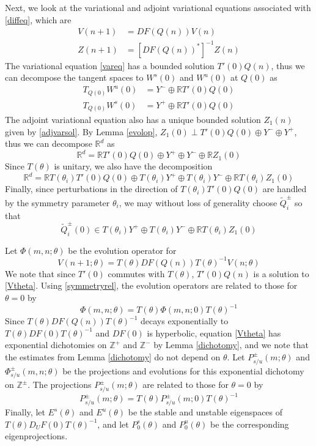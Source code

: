 \documentclass[12pt]{article}
\def\R{{\mathbb R}}
\def\Z{{\mathbb Z}}
\begin{document}
Next, we look at the variational and adjoint variational equations associated with \eqref{diffeq}, which are
\begin{align}
V(n+1) &= D F(Q(n)) V(n) \label{vareq} \\
Z(n+1) &= [D F(Q(n))^*]^{-1} Z(n) \label{adjvareq} 
\end{align}
The variational equation \eqref{vareq} has a bounded solution $T'(0) Q(n)$, thus we can decompose the tangent spaces to $W^s(0)$ and $W^u(0)$ at $Q(0)$ as
\begin{align*}
T_{Q(0)} W^u(0) &= Y^- \oplus \R T'(0) Q(0) \\
T_{Q(0)} W^s(0) &= Y^+ \oplus \R T'(0) Q(0)
\end{align*}
The adjoint variational equation also has a unique bounded solution $Z_1(n)$ given by \eqref{adjvarsol}. By Lemma \ref{evolop}, $Z_1(0) \perp T'(0) Q(0) \oplus Y^- \oplus Y^+$, thus we can decompose $\R^d$ as
\begin{equation}\label{nontdecomp}
\R^d = \R T'(0) Q(0) \oplus Y^+ \oplus Y^- \oplus \R Z_1(0)
\end{equation}
Since $T(\theta)$ is unitary, we also have the decomposition
\begin{equation}\label{nontdecompT}
\R^d = \R T(\theta_i) T'(0) Q(0) \oplus T(\theta_i) Y^+ \oplus T(\theta_i) Y^- \oplus \R T(\theta_i) Z_1(0)
\end{equation}
Finally, since perturbations in the direction of $T(\theta_i) T'(0) Q(0)$ are handled by the symmetry parameter $\theta_i$, we may without loss of generality choose $\tilde{Q}_i^\pm$ so that 
\begin{equation}\label{W0loc}
\tilde{Q}_i^\pm(0) \in T(\theta_i) Y^+ \oplus T(\theta_i) Y^- \oplus \R T(\theta_i) Z_1(0)
\end{equation}

Let $\Phi(m, n; \theta)$ be the evolution operator for
\begin{equation}\label{Vtheta}
V(n+1; \theta) = T(\theta) D F(Q(n)) T(\theta)^{-1} V(n; \theta) 
\end{equation}
We note that since $T'(0)$ commutes with $T(\theta)$, $T'(0)Q(n)$ is a solution to \eqref{Vtheta}. Using \eqref{symmetryrel}, the evolution operators are related to those for $\theta = 0$ by
\begin{equation}\label{evoloptheta}
\Phi(m, n; \theta) = T(\theta)\Phi(m, n; 0)T(\theta)^{-1}
\end{equation}
Since $T(\theta) D F(Q(n)) T(\theta)^{-1}$ decays exponentially to $T(\theta) D F(0) T(\theta)^{-1}$ and $D F(0)$ is hyperbolic, equation \eqref{Vtheta} has exponential dichotomies on $\Z^+$ and $\Z^-$ by Lemma \ref{dichotomy}, and we note that the estimates from Lemma \ref{dichotomy} do not depend on $\theta$. Let $P_{s/u}^\pm(m; \theta)$ and $\Phi_{s/u}^\pm(m, n; \theta)$ be the projections and evolutions for this exponential dichotomy on $\Z^\pm$. The projections $P_{s/u}^\pm(m; \theta)$ are related to those for $\theta = 0$ by
\[
P_{s/u}^\pm(m; \theta) = T(\theta)P_{s/u}^\pm(m; 0)T(\theta)^{-1}
\]
Finally, let $E^s(\theta)$ and $E^u(\theta)$ be the stable and unstable eigenspaces of $T(\theta) D_U F(0) T(\theta)^{-1}$, and let $P_0^s(\theta)$ and $P_0^u(\theta)$ be the corresponding eigenprojections.
\end{document}

